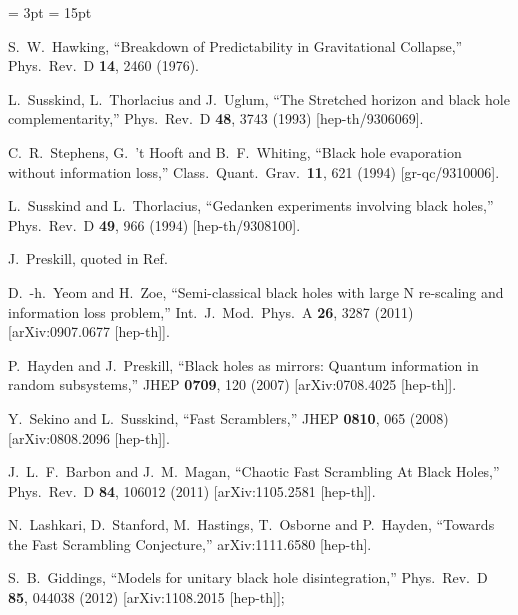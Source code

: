 \documentclass[12pt]{article}
\begin{document}
\begin{thebibliography}{99}
\itemsep = 3pt
\baselineskip = 15pt

  S.~W.~Hawking,
  ``Breakdown of Predictability in Gravitational Collapse,''
  Phys.\ Rev.\ D {\bf 14}, 2460 (1976).

  L.~Susskind, L.~Thorlacius and J.~Uglum,
  ``The Stretched horizon and black hole complementarity,''
  Phys.\ Rev.\ D {\bf 48}, 3743 (1993)
  [hep-th/9306069].

  C.~R.~Stephens, G.~'t Hooft and B.~F.~Whiting,
  ``Black hole evaporation without information loss,''
  Class.\ Quant.\ Grav.\  {\bf 11}, 621 (1994)
  [gr-qc/9310006].

  L.~Susskind and L.~Thorlacius,
  ``Gedanken experiments involving black holes,''
  Phys.\ Rev.\ D {\bf 49}, 966 (1994)
  [hep-th/9308100].

J.~Preskill, quoted in Ref.~\cite{Susskind:1993if}

  D.~-h.~Yeom and H.~Zoe,
  ``Semi-classical black holes with large N re-scaling and information loss problem,''
  Int.\ J.\ Mod.\ Phys.\ A {\bf 26}, 3287 (2011)
  [arXiv:0907.0677 [hep-th]].


  P.~Hayden and J.~Preskill,
  ``Black holes as mirrors: Quantum information in random subsystems,''
  JHEP {\bf 0709}, 120 (2007)
  [arXiv:0708.4025 [hep-th]].

  Y.~Sekino and L.~Susskind,
  ``Fast Scramblers,''
  JHEP {\bf 0810}, 065 (2008)
  [arXiv:0808.2096 [hep-th]].

  J.~L.~F.~Barbon and J.~M.~Magan,
  ``Chaotic Fast Scrambling At Black Holes,''
  Phys.\ Rev.\ D {\bf 84}, 106012 (2011)
  [arXiv:1105.2581 [hep-th]].

  N.~Lashkari, D.~Stanford, M.~Hastings, T.~Osborne and P.~Hayden,
  ``Towards the Fast Scrambling Conjecture,''
  arXiv:1111.6580 [hep-th].

  S.~B.~Giddings,
  ``Models for unitary black hole disintegration,''
  Phys.\ Rev.\ D {\bf 85}, 044038 (2012)
  [arXiv:1108.2015 [hep-th]];


\end{thebibliography}
\end{document}
